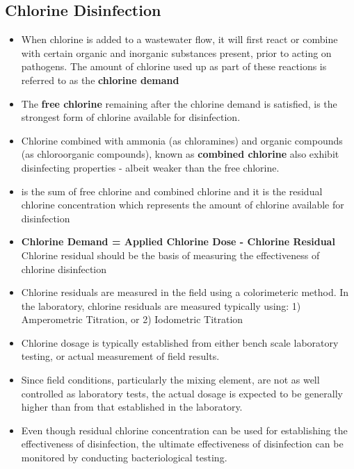 \documentclass{article}
\begin{document}
\subsection{Chlorine Disinfection}

\begin{itemize}
\item When chlorine is added to a wastewater flow, it will first react or combine with certain organic and inorganic substances present, prior to acting on pathogens.  The amount of chlorine used up as part of these reactions is referred to as the \textbf{chlorine demand}\\

\item The \textbf{free chlorine} remaining after the chlorine demand is satisfied, is the strongest form of chlorine available for disinfection.  

\item Chlorine combined with ammonia (as chloramines) and organic compounds (as chloroorganic compounds), known as \textbf{combined chlorine} also exhibit disinfecting properties - albeit weaker than the free chlorine.

\item {} is the sum of free chlorine and combined chlorine and it is the residual chlorine concentration which represents the amount of chlorine available for disinfection 

\item \textbf{Chlorine Demand = Applied Chlorine Dose - Chlorine Residual}\\ Chlorine residual should be the basis of measuring the effectiveness of chlorine disinfection

\item Chlorine residuals are measured in the field using a colorimeteric method.  In the laboratory, chlorine residuals are measured typically using: 1) Amperometric Titration, or 2) Iodometric Titration

\item Chlorine dosage is typically established from either bench scale laboratory testing, or actual measurement of field results. 

\item Since field conditions, particularly the mixing element, are not as well controlled as laboratory tests, the actual dosage is expected to be generally higher than from that established in the laboratory. 

\item Even though residual chlorine concentration can be used for establishing the effectiveness of disinfection, the ultimate effectiveness of disinfection can be monitored by conducting bacteriological testing.

\end{itemize}
\end{document}

